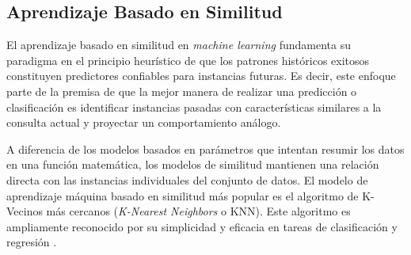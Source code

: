 \documentclass[12pt]{article}
\begin{document}

\subsection{Aprendizaje Basado en Similitud}
El aprendizaje basado en similitud en \textit{machine learning} fundamenta su paradigma en el principio heurístico de que los patrones históricos exitosos constituyen predictores confiables para instancias futuras. Es decir, este enfoque parte de la premisa de que la mejor manera de realizar una predicción o clasificación es identificar instancias pasadas con características similares a la consulta actual y proyectar un comportamiento análogo.

A diferencia de los modelos basados en parámetros que intentan resumir los datos en una función matemática, los modelos de similitud mantienen una relación directa con las instancias individuales del conjunto de datos. El modelo de aprendizaje máquina basado en similitud más popular es el algoritmo de K-Vecinos más cercanos (\textit{K-Nearest Neighbors} o KNN). Este algoritmo es ampliamente reconocido por su simplicidad y eficacia en tareas de clasificación y regresión \cite{bishop2006pattern}.
\end{document}
